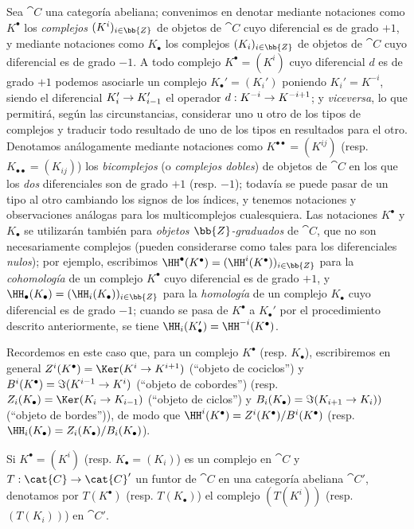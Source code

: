 \documentclass[oneside]{amsart}
\makeatletter
\newcommand{\ega@arrow}[2]{\mathchoice{#1}{#2}{#2}{#2}}
\renewcommand{\to}{\ega@arrow{\longrightarrow}{\rightarrow}}
\let\EGAOriginalLabel\label
\renewcommand{\label}[1]{\phantomsection\EGAOriginalLabel{#1}}
\makeatother
\begin{document}
\begin{env}[11.2.1]
\label{0.11.2.1}
Sea $\cat{C}$ una categoría abeliana; convenimos en denotar mediante notaciones como $K^\bullet$ los \emph{complejos $(K^i)_{i\in\bb{Z}}$} de objetos de $\cat{C}$ cuyo diferencial es de grado $+1$, y mediante notaciones como $K_\bullet$ los complejos $(K_i)_{i\in\bb{Z}}$ de objetos de $\cat{C}$ cuyo diferencial es de grado $-1$.
A todo complejo $K^\bullet=(K^i)$ cuyo diferencial $d$ es de grado $+1$ podemos asociarle un complejo $K_\bullet'=(K_i')$ poniendo $K_i'=K^{-i}$, siendo el diferencial $K_i'\to K_{i-1}'$ el operador $d:K^{-i}\to K^{-i+1}$; y \emph{viceversa}, lo que permitirá, según las circunstancias, considerar uno u otro de los tipos de complejos y traducir todo resultado de uno de los tipos en resultados para el otro.
Denotamos análogamente mediante notaciones como $K^{\bullet\bullet}=(K^{ij})$ (resp. $K_{\bullet\bullet}=(K_{ij})$) los \emph{bicomplejos} (o \emph{complejos dobles}) de objetos de $\cat{C}$ en los que los \emph{dos} diferenciales son de grado $+1$ (resp. $-1$); todavía se puede pasar de un tipo al otro cambiando los signos de los índices, y tenemos notaciones y observaciones análogas para los multicomplejos cualesquiera.
Las notaciones $K^\bullet$ y $K_\bullet$ se utilizarán también para \emph{objetos $\bb{Z}$-graduados} de $\cat{C}$, que no son necesariamente complejos (pueden considerarse como tales para los diferenciales \emph{nulos}); por ejemplo, escribimos $\HH^\bullet(K^\bullet)=(\HH^i(K^\bullet))_{i\in\bb{Z}}$ para la \emph{cohomología} de un complejo $K^\bullet$ cuyo diferencial es de grado $+1$, y $\HH_\bullet(K_\bullet)=(\HH_i(K_\bullet))_{i\in\bb{Z}}$ para la \emph{homología} de un complejo $K_\bullet$ cuyo diferencial es de grado $-1$; cuando se pasa de $K^\bullet$ a $K_\bullet'$ por el procedimiento descrito anteriormente, se tiene $\HH_i(K_\bullet')=\HH^{-i}(K^\bullet)$.

Recordemos en este caso que, para un complejo $K^\bullet$ (resp. $K_\bullet$), escribiremos en general $Z^i(K^\bullet)=\Ker(K^i\to K^{i+1})$ (``objeto de cociclos'') y $B^i(K^\bullet)=\Im(K^{i-1}\to K^i)$ (``objeto de cobordes'') (resp. $Z_i(K_\bullet)=\Ker(K_i\to K_{i-1})$ (``objeto de ciclos'') y $B_i(K_\bullet)=\Im(K_{i+1}\to K_i))$ (``objeto de bordes'')), de modo que $\HH^i(K^\bullet)=Z^i(K^\bullet)/B^i(K^\bullet)$ (resp. $\HH_i(K_\bullet)=Z_i(K_\bullet)/B_i(K_\bullet)$).

Si $K^\bullet=(K^i)$ (resp. $K_\bullet=(K_i)$) es un complejo en $\cat{C}$ y $T:\cat{C}\to\cat{C}'$ un funtor de $\cat{C}$ en una categoría abeliana $\cat{C}'$, denotamos por $T(K^\bullet)$ (resp. $T(K_\bullet)$) el complejo $(T(K^i))$ (resp. $(T(K_i))$) en $\cat{C}'$.


\end{env}
\end{document}
